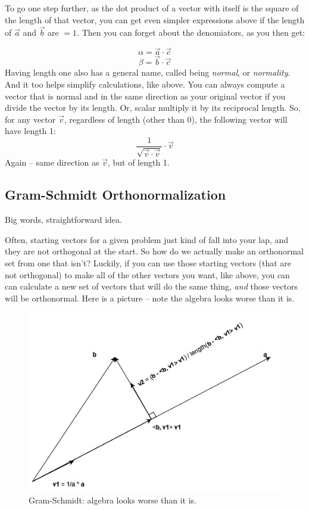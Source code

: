 \documentclass[
]{book}
\begin{document}
To go one step further, as the dot product of a vector with itself is the square of the length of that vector, you can get even simpler expressions above if the length of \(\vec{a}\) and \(\vec{b}\) are \(= 1\). Then you can forget about the denomiators, as you then get:

\[\alpha = \vec{a}\cdot\vec{c}\]
\[\beta = \vec{b}\cdot\vec{c}\]
Having length one also has a general name, called being \emph{normal}, or \emph{normality}. And it too helps simplify calculations, like above. You can always compute a vector that is normal and in the same direction as your original vector if you divide the vector by its length. Or, scalar multiply it by its reciprocal length. So, for any vector \(\vec{v}\), regardless of length (other than 0), the following vector will have length 1:
\[\frac{1}{\sqrt{\vec{v}\cdot\vec{v}}}\cdot\vec{v}\]
Again -- same direction as \(\vec{v}\), but of length 1.

\hypertarget{gram-schmidt-orthonormalization}{%
\subsection{Gram-Schmidt Orthonormalization}\label{gram-schmidt-orthonormalization}}

Big words, straightforward idea.

Often, starting vectors for a given problem just kind of fall into your lap, and they are not orthogonal at the start. So how do we actually make an orthonormal set from one that isn't? Luckily, if you can use those starting vectors (that are not orthogonal) to make all of the other vectors you want, like above, you can can calculate a new set of vectors that will do the same thing, \emph{and} those vectors will be orthonormal. Here is a picture -- note the algebra looks worse than it is.

\begin{figure}

{\centering \includegraphics[width=0.75\linewidth,height=0.75\textheight]{images/gram-schmidt} 

}

\caption{Gram-Schmidt: algebra looks worse than it is.}\label{fig:unnamed-chunk-3}
\end{figure}
\end{document}
